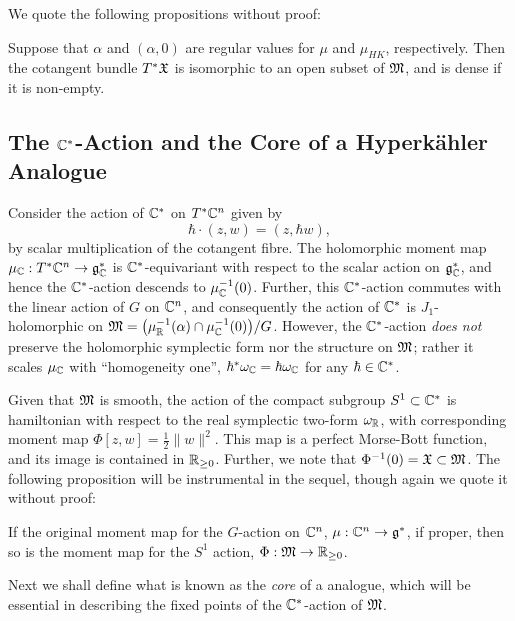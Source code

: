 We quote the following propositions without proof:

\begin{prop}
	Suppose that $\alpha$ and $(\alpha,0)$ are regular values for $\mu$ and $\mu_{HK}$, respectively. Then the cotangent bundle $T^{\ast}\mathfrak{X}$ is isomorphic to an open subset of $\mathfrak{M}$, and is dense if it is non-empty.
\end{prop}

\subsection{The $\mathbb{C}^{\ast}$-Action and the Core of a Hyperk{\"a}hler Analogue}

Consider the action of $\mathbb{C}^{\ast}$ on $T^{\ast}\mathbb{C}^{n}$ given by
$$
	\hbar \cdot (z,w) = (z,\hbar w),
$$
\ie by scalar multiplication of the cotangent fibre. The holomorphic moment map $\mu_{\mathbb{C}}:T^{\ast}\mathbb{C}^{n} \rightarrow \mathfrak{g}_{\mathbb{C}}^{\ast}$ is $\mathbb{C}^{\ast}$-equivariant with respect to the scalar action on $\mathfrak{g}_{\mathbb{C}}^{\ast}$, and hence the $\mathbb{C}^{\ast}$-action descends to $\mu_{\mathbb{C}}^{-1}(0)$. Further, this $\mathbb{C}^{\ast}$-action commutes with the linear action of $G$ on $\mathbb{C}^{n}$, and consequently the action of $\mathbb{C}^{\ast}$ is $J_{1}$-holomorphic on $\mathfrak{M} = \big(\mu_{\mathbb{R}}^{-1}(\alpha) \cap \mu_{\mathbb{C}}^{-1}(0)\big)/G$. However, the $\mathbb{C}^{\ast}$-action \emph{does not} preserve the holomorphic symplectic form nor the \HK structure on $\mathfrak{M}$; rather it scales $\mu_{\mathbb{C}}$ with ``homogeneity one'', \ie $\hbar^{\ast}\omega_{\mathbb{C}} = \hbar \omega_{\mathbb{C}}$ for any $\hbar\in \mathbb{C}^{\ast}$.

Given that $\mathfrak{M}$ is smooth, the action of the compact subgroup $S^{1} \subset \mathbb{C}^{\ast}$ is hamiltonian with respect to the real symplectic two-form $\omega_{\mathbb{R}}$, with corresponding moment map $\Phi[z,w] = \tfrac{1}{2}\|w\|^{2}$. This map is a perfect Morse-Bott function, and its image is contained in $\mathbb{R}_{\geq 0}$. Further, we note that $\Phi^{-1}(0) = \mathfrak{X} \subset \mathfrak{M}$. The following proposition will be instrumental in the sequel, though again we quote it without proof:

\begin{prop}
	If the original moment map for the $G$-action on $\mathbb{C}^{n}$, $\mu: \mathbb{C}^{n} \rightarrow \mathfrak{g}^{\ast}$, if proper, then so is the moment map for the $S^{1}$ action, $\Phi:\mathfrak{M} \rightarrow \mathbb{R}_{\geq 0}$.
\end{prop}

Next we shall define what is known as the \emph{core} of a \HK analogue, which will be essential in describing the fixed points of the $\mathbb{C}^{\ast}$-action of $\mathfrak{M}$.

